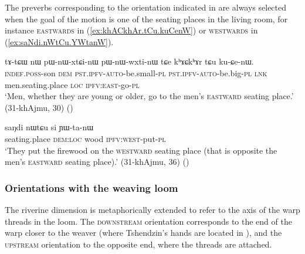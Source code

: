 The preverbs corresponding to the orientation indicated in  are always selected when the goal of the motion is one of the seating places in the living room, for instance \textsc{eastwards} in (\ref{ex:khACkhAr.tCu.kuCenW}) or \textsc{westwards} in (\ref{ex:saNdi.nWtCu.YWtanW}).

\begin{exe}
\ex \label{ex:khACkhAr.tCu.kuCenW}
\gll tɤ-tɕɯ nɯ pɯ-nɯ-xtɕi-nɯ pɯ-nɯ-wxti-nɯ tɕe kʰɤɕkʰɤr tɕu ku-ɕe-nɯ. \\
\textsc{indef}.\textsc{poss}-son \textsc{dem} \textsc{pst}.\textsc{ipfv}-\textsc{auto}-be.small-\textsc{pl} \textsc{pst}.\textsc{ipfv}-\textsc{auto}-be.big-\textsc{pl} \textsc{lnk} men.seating.place \textsc{loc} \textsc{ipfv}:\textsc{east}-go-\textsc{pl} \\
\glt `Men, whether they are young or older, go to the men's \textsc{eastward} seating place.' (31-khAjmu, 30)
()
\end{exe}

\begin{exe}
\ex \label{ex:saNdi.nWtCu.YWtanW}
\gll  saŋdi nɯtɕu si ɲɯ-ta-nɯ \\
seating.place \textsc{dem}:\textsc{loc} wood \textsc{ipfv}:\textsc{west}-put-\textsc{pl} \\
\glt `They put the firewood on the \textsc{westward} seating place (that is opposite the men's \textsc{eastward} seating place).' (31-khAjmu, 36) ()
\end{exe}




\subsubsection{Orientations with the weaving loom} \label{sec:orientation.loom}
The riverine dimension is metaphorically extended to refer to the axis of the warp threads in the loom. The \textsc{downstream} orientation corresponds to the end of the warp closer to the weaver (where Tshendzin's hands are located in ), and the \textsc{upstream} orientation to the opposite end, where the threads are attached.

